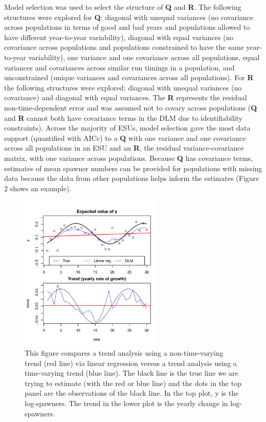 \documentclass[
  letterpaper,
  oneside,
  open=any]{scrbook}
\begin{document}
Model selection was used to select the structure of \textbf{Q} and
\textbf{R}. The following structures were explored for \textbf{Q}:
diagonal with unequal variances (no covariance across populations in
terms of good and bad years and populations allowed to have different
year-to-year variability), diagonal with equal variances (no covariance
across populations and populations constrained to have the same
year-to-year variability), one variance and one covariance across all
populations, equal variances and covariances across similar run timings
in a population, and unconstrained (unique variances and covariances
across all populations). For \textbf{R} the following structures were
explored: diagonal with unequal variances (no covariance) and diagonal
with equal variances. The \textbf{R} represents the residual
non-time-dependent error and was assumed not to covary across
populations (\textbf{Q} and \textbf{R} cannot both have covariance terms
in the DLM due to identifiability constraints). Across the majority of
ESUs, model selection gave the most data support (quantified with AICc)
to a \textbf{Q} with one variance and one covariance across all
populations in an ESU and an \textbf{R}, the residual
variance-covariance matrix, with one variance across populations.
Because \textbf{Q} has covariance terms, estimates of mean spawner
numbers can be provided for populations with missing data because the
data from other populations helps inform the estimates (Figure 2 shows
an example).

\begin{figure}

{\centering \includegraphics[width=2.69in,height=\textheight]{content/../media/image5.png}

}

\caption{This figure compares a trend analysis using a non-time-varying
trend (red line) via linear regression versus a trend analysis using a
time-varying trend (blue line). The black line is the true line we are
trying to estimate (with the red or blue line) and the dots in the top
panel are the observations of the black line. In the top plot, y is the
log-spawners. The trend in the lower plot is the yearly change in
log-spawners.}

\end{figure}
\end{document}
